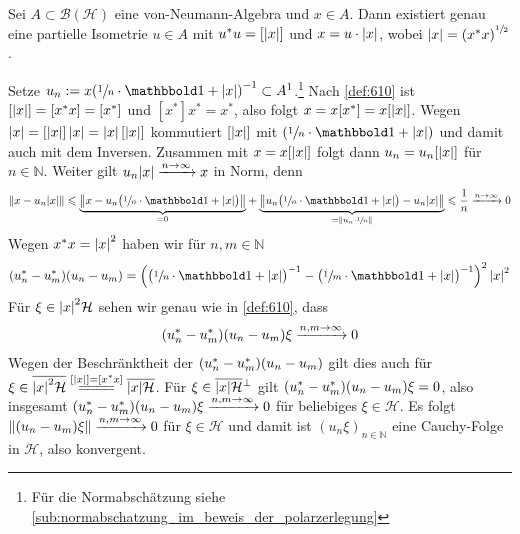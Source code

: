 \begin{satz}[{name={Polarzerlegung}},label=satz:611]
	Sei $A \subset \mathcal{B}(\mathcal{H})$ eine von-Neumann-Algebra und $x \in A$.
	Dann existiert genau eine partielle Isometrie $u \in A$ mit $u^*u=[\abs*{x}]$ und $x=u \cdot \abs*{x}$, wobei $\abs*{x}=\enbrace*{x^*x}^{\sfrac{1}{2}}$.
\end{satz}
\begin{beweis}
	Setze $u_n := x\enbrace*{\sfrac{1}{n} \cdot \ind + \abs*{x}}^{-1} \subset A^1$.\footnote{Für die Normabschätzung siehe \cref{sub:normabschatzung_im_beweis_der_polarzerlegung}}
	Nach \autoref{def:610} ist $[\abs*{x}]=[x^*x]= [x^*]$ und $[x^*]x^*=x^*$, also folgt $x=x[x^*]=x [\abs*{x}]$.
	Wegen $\abs*{x} = [\abs*{x}]\, \abs*{x}= \abs*{x}\, [\abs*{x}]$ kommutiert $\benbrace*{\abs*{x}}$ mit $\enbrace*{\sfrac{1}{n} \cdot \ind + \abs*{x}}$ und damit auch mit dem Inversen.
	Zusammen mit $x=x \benbrace*{\abs*{x}}$ folgt dann $u_n= u_n[\abs*{x}]$ für $n \in \mathbb{N}$.
	Weiter gilt $u_n \abs*{x} \grenzw{n \to \infty} x$ in Norm, denn 
	\begin{align}
		\norm*{x-u_n \abs*{x}} \le \Underbrace{\norm[\big]{x- u_n \enbrace[\big]{\sfrac{1}{n}\cdot \ind + \abs*{x} }}}{=0} + \Underbrace{\norm[\big]{ u_n \enbrace[\big]{\sfrac{1}{n} \cdot \ind + \abs*{x}} - u_n \abs*{x}}}{= \norm*{u_n \cdot \sfrac{1}{n}}}\le \frac{1}{n}  \grenzw{n \to \infty} 0
	\end{align}
	Wegen $x^*x= \abs*{x}^2$ haben wir für $n,m \in \mathbb{N}$
	\begin{align}
		\enbrace*{u_n^*- u_m^*} (u_n - u_m) = \enbrace*{ \enbrace[\big]{\sfrac{1}{n} \cdot \ind + \abs*{x}}^{-1} - \enbrace[\big]{\sfrac{1}{m} \cdot \ind + \abs*{x}}^{-1}}^2 \,\abs*{x}^2 
	\end{align}
	Für $\xi \in \abs*{x}^2 \mathcal{H}$ sehen wir genau wie in \autoref{def:610}, dass
	\begin{align}
		\enbrace*{u_n^*- u_m^*} (u_n - u_m) \xi \grenzw{n,m \to \infty} 0
	\end{align}
	Wegen der Beschränktheit der $\enbrace*{u_n^*- u_m^*} (u_n - u_m)$ gilt dies auch für $\xi \in \overline{\abs*{x}^2 \mathcal{H}} \stackrel{[\abs*{x}]=[x^*x]}{=\joinrel=\joinrel=\joinrel=} \overline{\abs*{x} \mathcal{H}}$.
	Für $\xi \in \overline{\abs*{x}\mathcal{H}}^{\raisemath{-3pt}{\bot}}$ gilt $\enbrace*{u_n^*- u_m^*} (u_n - u_m)\xi=0$, also insgesamt
	\(
		\enbrace*{u_n^*- u_m^*} (u_n - u_m) \xi \grenzw{\raisemath{-2pt}{n,m \to \infty}} 0
	\)
	für beliebiges $\xi \in \mathcal{H}$.
	Es folgt $\norm*{(u_n-u_m)\xi} \grenzw{\raisemath{-2pt}{n,m \to \infty}} 0$ für $\xi \in \mathcal{H}$ und damit ist $(u_n \xi)_{n \in \mathbb{N}}$ eine Cauchy-Folge in $\mathcal{H}$, also konvergent.

\end{beweis}

